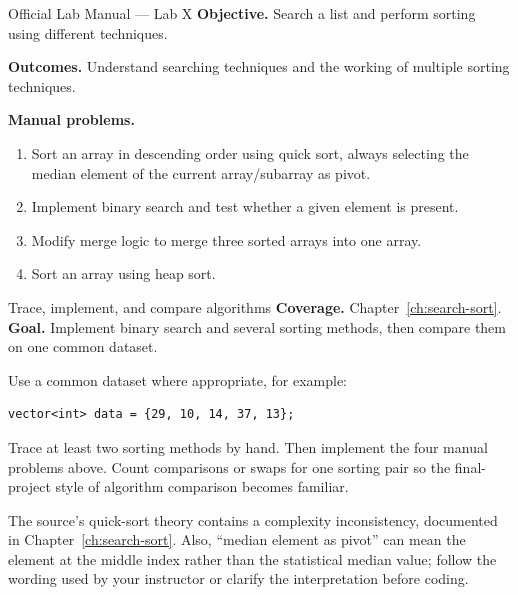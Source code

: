 
\begin{sourcealignment}{Official Lab Manual --- Lab X}
\textbf{Objective.} Search a list and perform sorting using different techniques.

\textbf{Outcomes.} Understand searching techniques and the working of multiple sorting techniques.

\textbf{Manual problems.}
\begin{enumerate}
  \item Sort an array in descending order using quick sort, always selecting the median element of the current array/subarray as pivot.
  \item Implement binary search and test whether a given element is present.
  \item Modify merge logic to merge three sorted arrays into one array.
  \item Sort an array using heap sort.
\end{enumerate}
\end{sourcealignment}

\begin{labproject}{Trace, implement, and compare algorithms}
\textbf{Coverage.} Chapter~\ref{ch:search-sort}.\\
\textbf{Goal.} Implement binary search and several sorting methods, then compare them on one common dataset.

Use a common dataset where appropriate, for example:
\begin{lstlisting}
vector<int> data = {29, 10, 14, 37, 13};
\end{lstlisting}

\begin{tryit}
Trace at least two sorting methods by hand. Then implement the four manual problems above. Count comparisons or swaps for one sorting pair so the final-project style of algorithm comparison becomes familiar.
\end{tryit}

\begin{clarification}
The source's quick-sort theory contains a complexity inconsistency, documented in Chapter~\ref{ch:search-sort}. Also, ``median element as pivot'' can mean the element at the middle index rather than the statistical median value; follow the wording used by your instructor or clarify the interpretation before coding.
\end{clarification}
\end{labproject}


